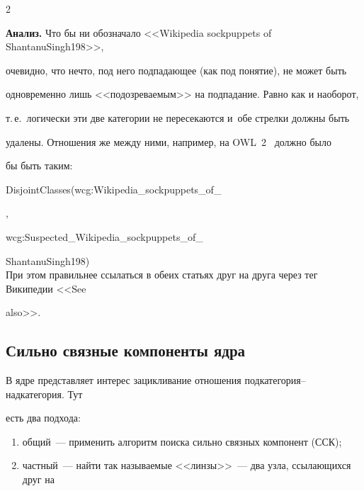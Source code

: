 \begin{multicols}{2}
      \vspace*{12pt}

   

   \textbf{Анализ.} Что бы ни обозначало <<Wikipedia sockpuppets of ShantanuSingh198>>, 

очевидно, что нечто, под него подпадающее (как под понятие), не может быть 

одновременно лишь <<подозреваемым>> на подпадание. Равно как и наоборот, 

т.\,е.\ логически эти две категории не пересекаются и~обе стрелки должны быть 

удалены. Отношения же между ними, например, на OWL~2~\cite{6-shk} должно было 

бы быть таким:\\



\noindent

 {\sf 

DisjointClasses(wcg:Wikipedia\_sockpuppets\_of\_}



, 



\noindent

{\sf wcg:Suspected\_Wikipedia\_sockpuppets\_of\_}



\noindent

{\sf ShantanuSingh198)}\\



   При этом правильнее ссылаться в обеих статьях друг на друга через тег Википедии <<See 

also>>.



\subsection{Сильно связные компоненты ядра}



   В ядре представляет интерес зацикливание отношения подкатегория--над\-ка\-те\-го\-рия. Тут 

есть два подхода:

   \begin{enumerate}[(1)]

   \item общий~--- применить алгоритм поиска сильно связных компонент (ССК);

   \item частный~--- найти так называемые <<линзы>>~--- два узла, ссылающихся друг на 


\end{enumerate}
\end{multicols}
